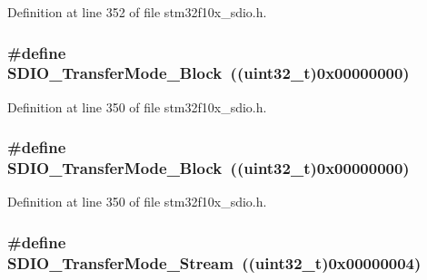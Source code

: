 Definition at line 352 of file stm32f10x\+\_\+sdio.\+h.

\subsubsection[{\texorpdfstring{S\+D\+I\+O\+\_\+\+Transfer\+Mode\+\_\+\+Block}{SDIO_TransferMode_Block}}]{\setlength{\rightskip}{0pt plus 5cm}\#define S\+D\+I\+O\+\_\+\+Transfer\+Mode\+\_\+\+Block~(({\bf uint32\+\_\+t})0x00000000)}\hypertarget{group___s_d_i_o___transfer___type_ga5b54ada18cc4072ceff1d98ee4b69972}{}\label{group___s_d_i_o___transfer___type_ga5b54ada18cc4072ceff1d98ee4b69972}


Definition at line 350 of file stm32f10x\+\_\+sdio.\+h.

\subsubsection[{\texorpdfstring{S\+D\+I\+O\+\_\+\+Transfer\+Mode\+\_\+\+Block}{SDIO_TransferMode_Block}}]{\setlength{\rightskip}{0pt plus 5cm}\#define S\+D\+I\+O\+\_\+\+Transfer\+Mode\+\_\+\+Block~(({\bf uint32\+\_\+t})0x00000000)}\hypertarget{group___s_d_i_o___transfer___type_ga5b54ada18cc4072ceff1d98ee4b69972}{}\label{group___s_d_i_o___transfer___type_ga5b54ada18cc4072ceff1d98ee4b69972}


Definition at line 350 of file stm32f10x\+\_\+sdio.\+h.

\subsubsection[{\texorpdfstring{S\+D\+I\+O\+\_\+\+Transfer\+Mode\+\_\+\+Stream}{SDIO_TransferMode_Stream}}]{\setlength{\rightskip}{0pt plus 5cm}\#define S\+D\+I\+O\+\_\+\+Transfer\+Mode\+\_\+\+Stream~(({\bf uint32\+\_\+t})0x00000004)}\hypertarget{group___s_d_i_o___transfer___type_gadd0cafe0a80e6b6cc5c22d838cbb2e28}{}\label{group___s_d_i_o___transfer___type_gadd0cafe0a80e6b6cc5c22d838cbb2e28}


